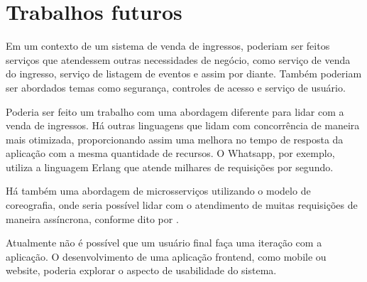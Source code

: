 
\chapter*[Trabalhos futuros]{Trabalhos futuros}\label{trabalhos-futuros}


Em um contexto de um sistema de venda de ingressos, poderiam ser feitos serviços que atendessem
outras necessidades de negócio, como serviço de venda do ingresso, serviço de listagem de eventos
e assim por diante.
Também poderiam ser abordados temas como segurança, controles de acesso e serviço de usuário.

Poderia ser feito um trabalho com uma abordagem diferente para lidar com a venda de ingressos.
Há outras linguagens que lidam com concorrência de maneira mais otimizada,
proporcionando assim uma melhora no tempo de resposta da aplicação com a mesma quantidade
de recursos.
O Whatsapp, por exemplo, utiliza a linguagem Erlang  que
atende milhares de requisições por segundo.

Há também uma abordagem de microsserviços utilizando o modelo de coreografia, onde seria possível
lidar com o atendimento de muitas requisições de maneira assíncrona, conforme dito por
\cite{scaling-microservices-event-stream}.

Atualmente não é possível que um usuário final faça uma iteração com a aplicação. O desenvolvimento
de uma aplicação frontend, como mobile ou website, poderia explorar o aspecto de usabilidade
do sistema.
